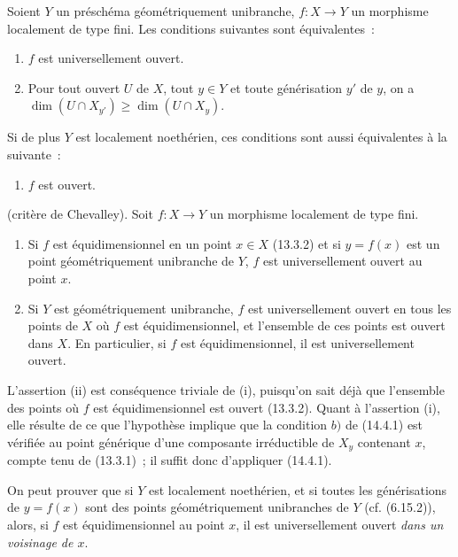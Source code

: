 \begin{corollary}[14.4.3]
\label{IV.14.4.3-fr}
Soient $Y$ un préschéma géométriquement unibranche, $f:X\to Y$ un morphisme
localement de type fini. Les conditions suivantes sont équivalentes~:
\begin{enumerate}[label=\emph{\alph*)}]
  \item $f$ est universellement ouvert.
  \item Pour tout ouvert $U$ de $X$, tout $y\in Y$ et toute générisation $y'$ de
  $y$, on a $\dim(U\cap X_{y'})\geq\dim(U\cap X_y)$.
\end{enumerate}
Si de plus $Y$ est localement noethérien, ces conditions sont aussi équivalentes à
la suivante~:
\begin{enumerate}[label=\emph{\alph*)}]
  \item[c)] $f$ est ouvert.
\end{enumerate}
\end{corollary}

\begin{corollary}[14.4.4]
\label{IV.14.4.4-fr}
(critère de Chevalley). Soit $f:X\to Y$ un morphisme localement de type fini.
\begin{enumerate}[label=(\roman*)]
  \item Si $f$ est équidimensionnel en un point $x\in X$ (13.3.2) et si
  $y=f(x)$ est un point géométriquement unibranche de $Y$, $f$ est
  universellement ouvert au point $x$.
  \item Si $Y$ est géométriquement unibranche, $f$ est universellement ouvert en
  tous les points de $X$ où $f$ est équidimensionnel, et l'ensemble de ces points
  est ouvert dans $X$. En particulier, si $f$ est équidimensionnel, il est
  universellement ouvert.
\end{enumerate}
\end{corollary}

L'assertion (ii) est conséquence triviale de (i), puisqu'on sait déjà que l'ensemble
des points où $f$ est équidimensionnel est ouvert (13.3.2). Quant à l'assertion (i),
elle résulte de ce que l'hypothèse implique que la condition $b)$ de (14.4.1) est
vérifiée au point générique d'une composante irréductible de $X_y$ contenant $x$,
compte tenu de (13.3.1)~; il suffit donc d'appliquer (14.4.1).

\begin{remark}[14.4.5]
\label{IV.14.4.5-fr}
On peut prouver que si $Y$ est localement noethérien, et si toutes les générisations
de $y=f(x)$ sont des points géométriquement unibranches de $Y$ (cf. (6.15.2)),
alors, si $f$ est équidimensionnel au point $x$, il est universellement ouvert
\emph{dans un voisinage de $x$}.
\end{remark}

